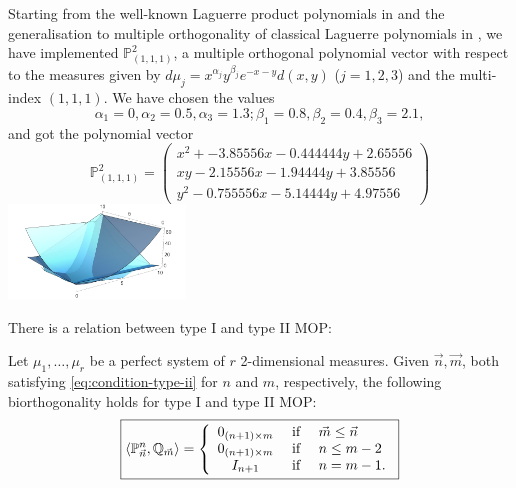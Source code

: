 \documentclass[portrait,final,a0paper,fontscale=0.38]{baposter}
\begin{document}
\begin{poster}
{%
}

{
Starting from the well-known Laguerre product polynomials in \cite{xu} and the generalisation to multiple orthogonality of classical Laguerre polynomials in \cite{Walter}, we have implemented $\mathbb P_{(1,1,1)}^2$, a multiple orthogonal polynomial vector with respect to the measures given by $d\mu_j=x^{\alpha_j} y^{\beta_j} e^{-x-y} d(x,y)$ ($j=1,2,3$) and the multi-index $(1,1,1)$. We have chosen the values $$\alpha_1 = 0, \alpha_2 = 0.5, \alpha_3 = 1.3; \beta_1 = 0.8, \beta_2 = 0.4, \beta_3 = 2.1,$$ and got the polynomial vector 
$$
\mathbb P_{(1,1,1)}^2 = \begin{pmatrix}
    x^2 + - 3.85556 x - 0.444444 y + 2.65556 \\ x y - 2.15556 x - 1.94444 y + 3.85556 \\  y^2 - 0.755556 x - 5.14444 y + 4.97556
\end{pmatrix}
$$
\centering\includegraphics*[height=2.5cm]{EjemploLaguerre}


}
{
There is a relation between type I and type II MOP:
\begin{theorem}
  \label{th:biorthogonality}
  Let $\mu_1,\dots,\mu_r$ be a perfect system of $r$ 2-dimensional measures. Given $\vec n, \vec m$, both satisfying \eqref{eq:condition-type-ii} for $n$ and $m$, respectively, the following biorthogonality holds for type I and type II MOP:
  \begin{equation}
      \boxed{\left\langle \mathbb P_{\vec n}^n , \mathbb Q_{\vec m} \right\rangle = \left\{\begin{array}{ccl}
          0_{(n+1)\times m} &   \text{ if } & \vec m \leq \vec n \\
          0_{(n+1)\times m} &   \text{ if } &  n \leq m -2 \\
          I_{n+1} & \text{ if } & n=m-1. 
      \end{array}\right.}
  \end{equation}
\end{theorem}

}
\end{poster}
\end{document}

